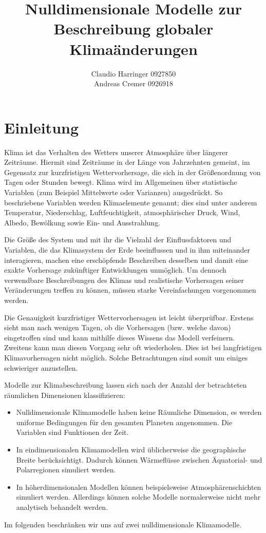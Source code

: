 \documentclass[]{report}
\title{Nulldimensionale Modelle zur Beschreibung globaler Klimaänderungen}
\author{Claudio Harringer 0927850 \\ Andreas Cremer 0926918}
\begin{document}
\maketitle
\tableofcontents
\chapter{Einleitung} 
	Klima ist das Verhalten des Wetters unserer Atmosphäre über längerer Zeiträume. Hiermit sind Zeiträume in der Länge von Jahrzehnten gemeint, im Gegensatz zur kurzfristigen Wettervorhersage, die sich in der Größenordnung von Tagen oder Stunden bewegt. Klima wird im Allgemeinen über statistische Variablen (zum Beispiel Mittelwerte oder Varianzen) ausgedrückt. So beschriebene Variablen werden Klimaelemente genannt; dies sind unter anderem Temperatur, Niederschlag, Luftfeuchtigkeit, atmosphärischer Druck, Wind, Albedo, Bewölkung sowie Ein- und Ausstrahlung.\par\bigskip
	Die Größe des System und mit ihr die Vielzahl der Einflussfaktoren und Variablen, die das Klimasystem der Erde beeinflussen und in ihm miteinander interagieren, machen eine erschöpfende Beschreiben desselben und damit eine exakte Vorhersage zukünftiger Entwicklungen unmöglich. Um dennoch verwendbare Beschreibungen des Klimas und realistische Vorhersagen seiner Veränderungen treffen zu können, müssen starke Vereinfachungen vorgenommen werden.\par\bigskip
	Die Genauigkeit kurzfristiger Wettervorhersagen ist leicht überprüfbar. Erstens sieht man nach wenigen Tagen, ob die Vorhersagen (bzw. welche davon) eingetroffen sind und kann mithilfe dieses Wissens das Modell verfeinern. Zweitens kann man diesen Vorgang sehr oft wiederholen. Dies ist bei langfristigen Klimavorhersagen nicht möglich. Solche Betrachtungen sind somit um einiges schwieriger anzustellen. \par\bigskip
	Modelle zur Klimabeschreibung lassen sich nach der Anzahl der betrachteten räumlichen Dimensionen klassifizieren:
	\begin{itemize}
		\item Nulldimensionale Klimamodelle haben keine Räumliche Dimension, es werden uniforme Bedingungen für den gesamten Planeten angenommen. Die Variablen sind Funktionen der Zeit.
		\item In eindimensionalen Klimamodellen wird üblicherweise die geographische Breite berücksichtigt. Dadurch können Wärmeflüsse zwischen Äquatorial- und Polarregionen simuliert werden.
		\item In höherdimensionalen Modellen können beispielsweise Atmosphärenschichten simuliert werden. Allerdings können solche Modelle normalerweise nicht mehr analytisch behandelt werden.
	\end{itemize}
	Im folgenden beschränken wir uns auf zwei nulldimensionale Klimamodelle.
	
\end{document}
